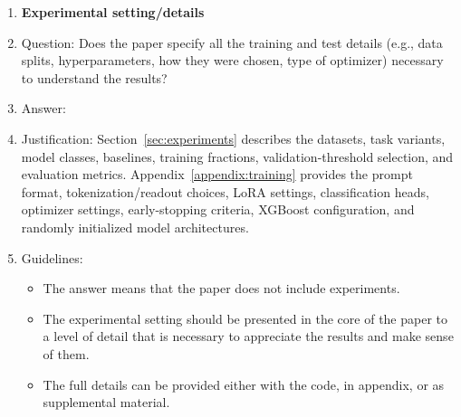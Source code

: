\documentclass{article}
\theoremstyle{plain}
\theoremstyle{definition}
\theoremstyle{remark}
\begin{document}
\begin{enumerate}
\item {\bf Experimental setting/details}
    \item[] Question: Does the paper specify all the training and test details (e.g., data splits, hyperparameters, how they were chosen, type of optimizer) necessary to understand the results?
   \item[] Answer: \answerYes{}
    \item[] Justification: Section~\ref{sec:experiments} describes the datasets, task variants, model classes, baselines, training fractions, validation-threshold selection, and evaluation metrics. Appendix~\ref{appendix:training} provides the prompt format, tokenization/readout choices, LoRA settings, classification heads, optimizer settings, early-stopping criteria, XGBoost configuration, and randomly initialized model architectures.
    \item[] Guidelines:
    \begin{itemize}
        \item The answer \answerNA{} means that the paper does not include experiments.
        \item The experimental setting should be presented in the core of the paper to a level of detail that is necessary to appreciate the results and make sense of them.
        \item The full details can be provided either with the code, in appendix, or as supplemental material.
    \end{itemize}


\end{enumerate}
\end{document}
